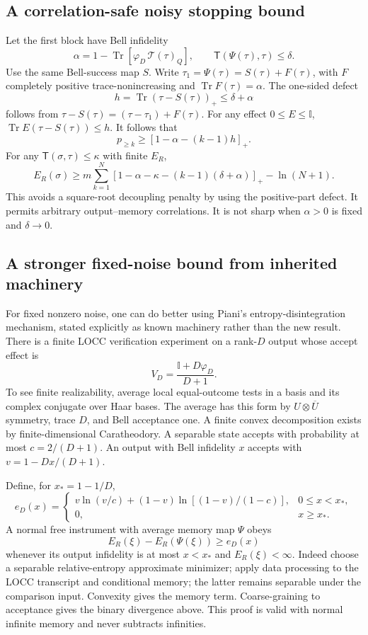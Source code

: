 \documentclass[11pt,a4paper]{article}
\newcommand{\tr}{\operatorname{Tr}}
\newcommand{\ER}{E_R}
\newcommand{\dist}{\mathsf T}
\newcommand{\ph}{\varphi}
\newcommand{\I}{\mathbb I}
\begin{document}
\subsection{A correlation-safe noisy stopping bound}
Let the first block have Bell infidelity
\[
 \alpha=1-\tr[\ph_D\,\mathcal T(\tau)_Q],
 \qquad \dist(\Psi(\tau),\tau)\le\delta .
\]
Use the same Bell-success map \(S\). Write
\(\tau_1=\Psi(\tau)=S(\tau)+F(\tau)\), with \(F\) completely positive
trace-nonincreasing and \(\tr F(\tau)=\alpha\).
The one-sided defect
\[
 h=\tr(\tau-S(\tau))_+\le\delta+\alpha                       \tag{18}
\]
follows from \(\tau-S(\tau)=(\tau-\tau_1)+F(\tau)\).
For any effect \(0\le E\le\I\), \(\tr E(\tau-S(\tau))\le h\).
It follows that
\[
 p_{\ge k}\ge[1-\alpha-(k-1)h]_+ .
\]
For any \(\dist(\sigma,\tau)\le\kappa\) with finite \(\ER\),
\[
 \boxed{\ 
 \ER(\sigma)\ge
 m\sum_{k=1}^N[1-\alpha-\kappa-(k-1)(\delta+\alpha)]_+
                      -\ln(N+1).
 \ }                                                       \tag{19}
\]
This avoids a square-root decoupling penalty by using the positive-part defect.
It permits arbitrary output--memory correlations.
It is not sharp when \(\alpha>0\) is fixed and \(\delta\to0\).

\subsection{A stronger fixed-noise bound from inherited machinery}
For fixed nonzero noise, one can do better using Piani's entropy-disintegration
mechanism, stated explicitly as known machinery rather than the new result.
There is a finite LOCC verification experiment on a rank-\(D\) output whose
accept effect is
\[
 V_D=\frac{\I+D\ph_D}{D+1}.
\]
To see finite realizability, average local equal-outcome tests in a basis and
its complex conjugate over Haar bases. The average has this form by
\(U\otimes\overline U\) symmetry, trace \(D\), and Bell acceptance one.
A finite convex decomposition exists by finite-dimensional Caratheodory.
A separable state accepts with probability at most \(c=2/(D+1)\).
An output with Bell infidelity \(x\) accepts with
\(v=1-Dx/(D+1)\).

Define, for \(x_*=1-1/D\),
\[
 e_D(x)=
 \begin{cases}
 v\ln(v/c)+(1-v)\ln[(1-v)/(1-c)],&0\le x<x_*,\\
 0,&x\ge x_* .
 \end{cases}
\]
A normal free instrument with average memory map \(\Psi\) obeys
\[
 \ER(\xi)-\ER(\Psi(\xi))\ge e_D(x)
\]
whenever its output infidelity is at most \(x<x_*\) and \(\ER(\xi)<\infty\).
Indeed choose a separable relative-entropy approximate minimizer; apply
data processing to the LOCC transcript and conditional memory; the latter
remains separable under the comparison input. Convexity gives the memory
term. Coarse-graining to acceptance gives the binary divergence above.
This proof is valid with normal infinite memory and never subtracts infinities.
\end{document}
